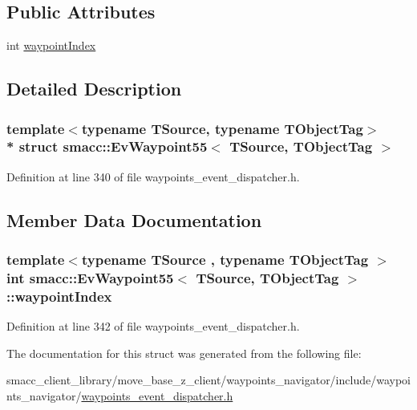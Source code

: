 \subsection*{Public Attributes}
\begin{DoxyCompactItemize}
\item 
int \hyperlink{structsmacc_1_1EvWaypoint55_a92fc8776aab6cf81da96f8688d709a82}{waypoint\+Index}
\end{DoxyCompactItemize}


\subsection{Detailed Description}
\subsubsection*{template$<$typename T\+Source, typename T\+Object\+Tag$>$\\*
struct smacc\+::\+Ev\+Waypoint55$<$ T\+Source, T\+Object\+Tag $>$}



Definition at line 340 of file waypoints\+\_\+event\+\_\+dispatcher.\+h.



\subsection{Member Data Documentation}
\subsubsection[{\texorpdfstring{waypoint\+Index}{waypointIndex}}]{\setlength{\rightskip}{0pt plus 5cm}template$<$typename T\+Source , typename T\+Object\+Tag $>$ int {\bf smacc\+::\+Ev\+Waypoint55}$<$ T\+Source, T\+Object\+Tag $>$\+::waypoint\+Index}\hypertarget{structsmacc_1_1EvWaypoint55_a92fc8776aab6cf81da96f8688d709a82}{}\label{structsmacc_1_1EvWaypoint55_a92fc8776aab6cf81da96f8688d709a82}


Definition at line 342 of file waypoints\+\_\+event\+\_\+dispatcher.\+h.



The documentation for this struct was generated from the following file\+:\begin{DoxyCompactItemize}
\item 
smacc\+\_\+client\+\_\+library/move\+\_\+base\+\_\+z\+\_\+client/waypoints\+\_\+navigator/include/waypoints\+\_\+navigator/\hyperlink{waypoints__event__dispatcher_8h}{waypoints\+\_\+event\+\_\+dispatcher.\+h}\end{DoxyCompactItemize}
